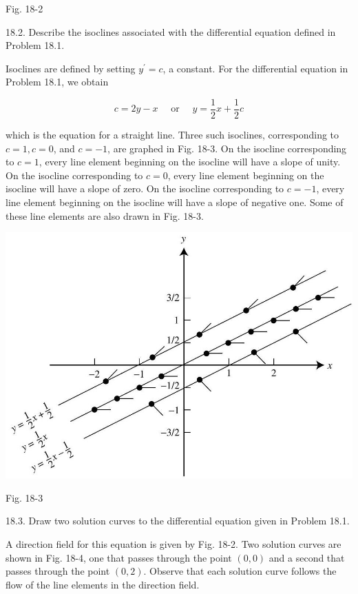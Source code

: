 \documentclass[10pt]{article}
\begin{document}
Fig. 18-2

18.2. Describe the isoclines associated with the differential equation defined in Problem 18.1.

Isoclines are defined by setting $y^{\prime}=c$, a constant. For the differential equation in Problem 18.1, we obtain

$$
c=2 y-x \quad \text { or } \quad y=\frac{1}{2} x+\frac{1}{2} c
$$

which is the equation for a straight line. Three such isoclines, corresponding to $c=1, c=0$, and $c=-1$, are graphed in Fig. 18-3. On the isocline corresponding to $c=1$, every line element beginning on the isocline will have a slope of unity. On the isocline corresponding to $c=0$, every line element beginning on the isocline will have a slope of zero. On the isocline corresponding to $c=-1$, every line element beginning on the isocline will have a slope of negative one. Some of these line elements are also drawn in Fig. 18-3.

\begin{center}
\includegraphics[max width=\textwidth]{2024_04_03_5bb5b4275a64cb9887d1g-178}
\end{center}

Fig. 18-3

18.3. Draw two solution curves to the differential equation given in Problem 18.1.

A direction field for this equation is given by Fig. 18-2. Two solution curves are shown in Fig. 18-4, one that passes through the point $(0,0)$ and a second that passes through the point $(0,2)$. Observe that each solution curve follows the flow of the line elements in the direction field.
\end{document}
